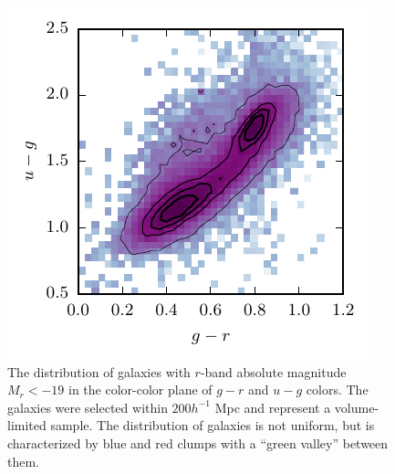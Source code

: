 \begin{figure}[t]
\centerline{
\includegraphics[scale=2.0]{fig/grug.pdf}}
\caption{The distribution of galaxies with $r$-band absolute magnitude $M_r<-19$ in the color-color plane of $g-r$ and $u-g$ colors. The galaxies were selected within $200h^{-1}$ Mpc and represent a volume-limited sample. The distribution of galaxies is not uniform, but is characterized by blue and red clumps with a ``green valley'' between them. \label{fig:gal_colcol}}
\end{figure}


